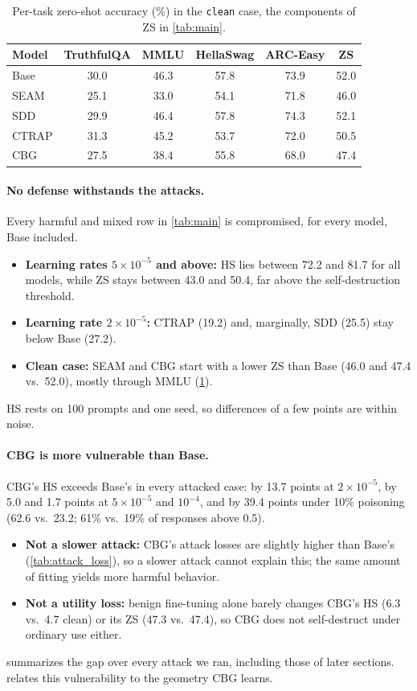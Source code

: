 \documentclass[11pt]{article}
\begin{document}
\begin{table}[t]
\centering
\small
\caption{Per-task zero-shot accuracy (\%) in the \texttt{clean} case, the components of ZS in \cref{tab:main}.}
\label{tab:clean_tasks}
\begin{tabular}{lccccc}
\toprule
Model & TruthfulQA & MMLU & HellaSwag & ARC-Easy & ZS\\
\midrule
Base & 30.0 & 46.3 & 57.8 & 73.9 & 52.0\\
SEAM & 25.1 & 33.0 & 54.1 & 71.8 & 46.0\\
SDD & 29.9 & 46.4 & 57.8 & 74.3 & 52.1\\
CTRAP & 31.3 & 45.2 & 53.7 & 72.0 & 50.5\\
CBG & 27.5 & 38.4 & 55.8 & 68.0 & 47.4\\
\bottomrule
\end{tabular}
\end{table}

\paragraph{No defense withstands the attacks.}
Every harmful and mixed row in \cref{tab:main} is compromised, for every model, Base included.
\begin{itemize}
  \item \textbf{Learning rates $5\times10^{-5}$ and above:} HS lies between 72.2 and 81.7 for all models, while ZS stays between 43.0 and 50.4, far above the self-destruction threshold.
  \item \textbf{Learning rate $2\times10^{-5}$:} CTRAP (19.2) and, marginally, SDD (25.5) stay below Base (27.2).
  \item \textbf{Clean case:} SEAM and CBG start with a lower ZS than Base (46.0 and 47.4 vs.\ 52.0), mostly through MMLU (\cref{tab:clean_tasks}).
\end{itemize}
HS rests on 100 prompts and one seed, so differences of a few points are within noise.

\paragraph{CBG is more vulnerable than Base.}
CBG's HS exceeds Base's in every attacked case: by 13.7 points at $2\times10^{-5}$, by 5.0 and 1.7 points at $5\times10^{-5}$ and $10^{-4}$, and by 39.4 points under 10\% poisoning (62.6 vs.\ 23.2; 61\% vs.\ 19\% of responses above 0.5).
\begin{itemize}
  \item \textbf{Not a slower attack:} CBG's attack losses are slightly higher than Base's (\cref{tab:attack_loss}), so a slower attack cannot explain this; the same amount of fitting yields more harmful behavior.
  \item \textbf{Not a utility loss:} benign fine-tuning alone barely changes CBG's HS (6.3 vs.\ 4.7 clean) or its ZS (47.3 vs.\ 47.4), so CBG does not self-destruct under ordinary use either.
\end{itemize}
 summarizes the gap over every attack we ran, including those of later sections.  relates this vulnerability to the geometry CBG learns.
\end{document}
